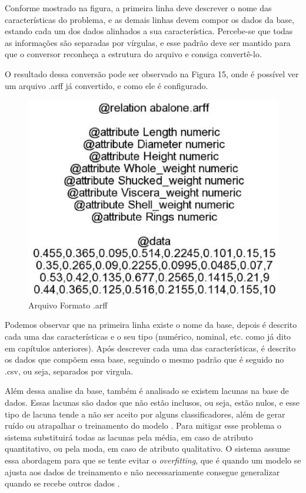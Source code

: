 Conforme mostrado na figura, a primeira linha deve descrever o nome das características do problema, e as demais linhas devem compor os dados da base, estando cada um dos dados alinhados a sua característica. Percebe-se que todas as informações são separadas por vírgulas, e esse padrão deve ser mantido para que o conversor reconheça a estrutura do arquivo e consiga convertê-lo.

O resultado dessa conversão pode ser observado na Figura 15, onde é possível ver um arquivo .arff já convertido, e como ele é configurado.

\begin{figure}[H]
	\centering
	\label{fig16}
		\includegraphics[keepaspectratio=true,scale=0.5]{figuras/fig16.eps}
	\caption{Arquivo Formato .arff}
\end{figure}

Podemos observar que na primeira linha existe o nome da base, depois é descrito cada uma das características e o seu tipo (numérico, nominal, etc. como já dito em capítulos anteriores). Após descrever cada uma das características, é descrito os dados que compõem essa base, seguindo o mesmo padrão que é seguido no .csv, ou seja, separados por virgula.

Além dessa analise da base, também é analisado se existem lacunas na base de dados. Essas lacunas são dados que não estão inclusos, ou seja, estão nulos, e esse tipo de lacuna tende a não ser aceito por alguns classificadores, além de gerar ruído ou atrapalhar o treinamento do modelo \cite{labic_2002}. Para mitigar esse problema o sistema substituirá todas as lacunas pela média, em caso de atributo quantitativo, ou pela moda, em caso de atributo qualitativo. O sistema assume essa abordagem para que se tente evitar o \textit{overfitting}, que é quando um modelo se ajusta aos dados de treinamento e não necessariamente consegue generalizar quando se recebe outros dados \cite{hawkins_2002}.

